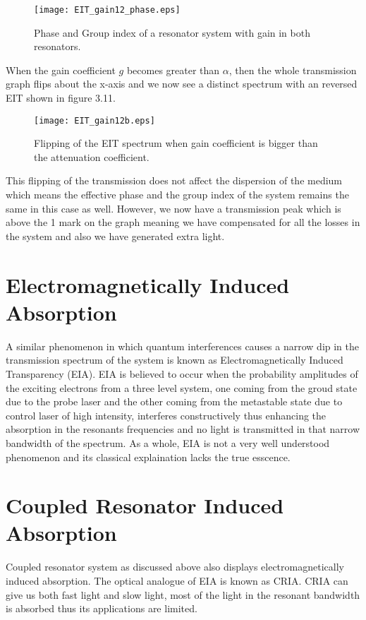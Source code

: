 \begin{figure}[h]
\centering
\texttt{[image: EIT\_gain12\_phase.eps]}
\caption{Phase and Group index of a resonator system with gain in both resonators.}
\end{figure}

When the gain coefficient $g$ becomes greater than $\alpha$, then the whole transmission graph flips about the x-axis and we now see a distinct spectrum with an reversed EIT shown in figure 3.11.

\begin{figure}[h]
\centering
\texttt{[image: EIT\_gain12b.eps]}
\caption{Flipping of the EIT spectrum when gain coefficient is bigger than the attenuation coefficient.}
\end{figure}

This flipping of the transmission does not affect the dispersion of the medium which means the effective phase and the group index of the system remains the same in this case as well. However, we now have a transmission peak which is above the 1 mark on the graph meaning we have compensated for all the losses in the system and also we have generated extra light.

\newpage


\section{Electromagnetically Induced Absorption}
A similar phenomenon in which quantum interferences causes a narrow dip in the transmission spectrum of the system is known as Electromagnetically Induced Transparency (EIA). EIA is believed to occur when the probability amplitudes of the exciting electrons from a three level system, one coming from the groud state due to the probe laser and the other coming from the metastable state due to control laser of high intensity, interferes constructively thus enhancing the absorption in the resonants frequencies and no light is transmitted in that narrow bandwidth of the spectrum.
As a whole, EIA is not a very well understood phenomenon and its classical explaination lacks the true esscence.

\section{Coupled Resonator Induced Absorption} 
 
Coupled resonator system as discussed above also displays electromagnetically induced absorption. The optical analogue of EIA is known as CRIA. CRIA can give us both fast light and slow light, most of the light in the resonant bandwidth is absorbed thus its applications are limited. 

